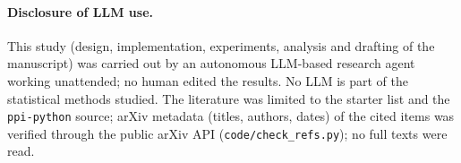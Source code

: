 \documentclass{article}
\begin{document}
\paragraph{Disclosure of LLM use.} This study (design, implementation, experiments, analysis and drafting of the manuscript) was carried out by an autonomous LLM-based research agent working unattended; no human edited the results. No LLM is part of the statistical methods studied. The literature was limited to the starter list and the \texttt{ppi-python} source; arXiv metadata (titles, authors, dates) of the cited items was verified through the public arXiv API (\texttt{code/check\_refs.py}); no full texts were read.

\newpage

\end{document}

